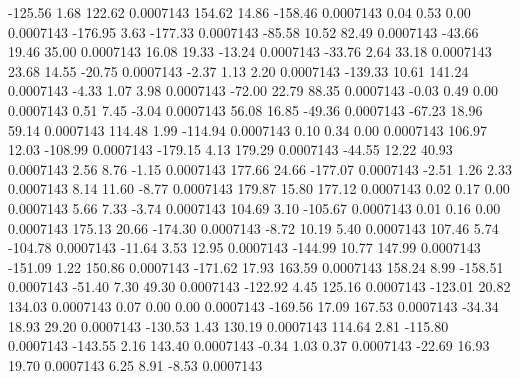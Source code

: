      -125.56        1.68      122.62     0.0007143
      154.62       14.86     -158.46     0.0007143
        0.04        0.53        0.00     0.0007143
     -176.95        3.63     -177.33     0.0007143
      -85.58       10.52       82.49     0.0007143
      -43.66       19.46       35.00     0.0007143
       16.08       19.33      -13.24     0.0007143
      -33.76        2.64       33.18     0.0007143
       23.68       14.55      -20.75     0.0007143
       -2.37        1.13        2.20     0.0007143
     -139.33       10.61      141.24     0.0007143
       -4.33        1.07        3.98     0.0007143
      -72.00       22.79       88.35     0.0007143
       -0.03        0.49        0.00     0.0007143
        0.51        7.45       -3.04     0.0007143
       56.08       16.85      -49.36     0.0007143
      -67.23       18.96       59.14     0.0007143
      114.48        1.99     -114.94     0.0007143
        0.10        0.34        0.00     0.0007143
      106.97       12.03     -108.99     0.0007143
     -179.15        4.13      179.29     0.0007143
      -44.55       12.22       40.93     0.0007143
        2.56        8.76       -1.15     0.0007143
      177.66       24.66     -177.07     0.0007143
       -2.51        1.26        2.33     0.0007143
        8.14       11.60       -8.77     0.0007143
      179.87       15.80      177.12     0.0007143
        0.02        0.17        0.00     0.0007143
        5.66        7.33       -3.74     0.0007143
      104.69        3.10     -105.67     0.0007143
        0.01        0.16        0.00     0.0007143
      175.13       20.66     -174.30     0.0007143
       -8.72       10.19        5.40     0.0007143
      107.46        5.74     -104.78     0.0007143
      -11.64        3.53       12.95     0.0007143
     -144.99       10.77      147.99     0.0007143
     -151.09        1.22      150.86     0.0007143
     -171.62       17.93      163.59     0.0007143
      158.24        8.99     -158.51     0.0007143
      -51.40        7.30       49.30     0.0007143
     -122.92        4.45      125.16     0.0007143
     -123.01       20.82      134.03     0.0007143
        0.07        0.00        0.00     0.0007143
     -169.56       17.09      167.53     0.0007143
      -34.34       18.93       29.20     0.0007143
     -130.53        1.43      130.19     0.0007143
      114.64        2.81     -115.80     0.0007143
     -143.55        2.16      143.40     0.0007143
       -0.34        1.03        0.37     0.0007143
      -22.69       16.93       19.70     0.0007143
        6.25        8.91       -8.53     0.0007143
